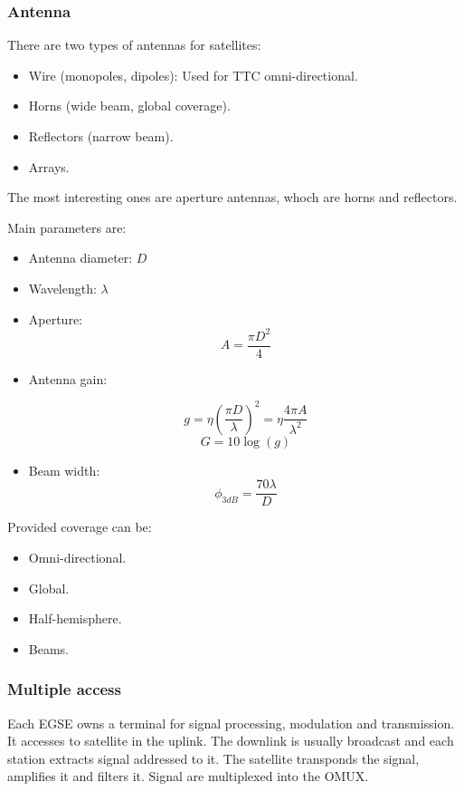 \documentclass[../main.tex]{subfiles}
\begin{document}
\subsubsection{Antenna}

There are two types of antennas for satellites:
\begin{itemize}
	\item Wire (monopoles, dipoles): Used for TTC omni-directional.
	\item Horns (wide beam, global coverage).
	\item Reflectors (narrow beam).
	\item Arrays.
\end{itemize}

The most interesting ones are aperture antennas, whoch are horns and reflectors.

Main parameters are:

\begin{itemize}
	\item Antenna diameter: $D$
	\item Wavelength: $\lambda$
	\item {
		Aperture:
		$$
			A = \frac {\pi D^2} {4}
		$$
	}
	\item {
		Antenna gain:

		$$
			g = \eta \left( \frac {\pi D} {\lambda} \right)^2 = \eta \frac {4 \pi A} {\lambda^2}
		$$
		$$
			G = 10 \log (g)
		$$
	}
	\item {
		Beam width:
		$$
			\phi_{3dB} = \frac {70 \lambda} {D}
		$$
	}
\end{itemize}

Provided coverage can be:
\begin{itemize}
	\item Omni-directional.
	\item Global.
	\item Half-hemisphere.
	\item Beams.
\end{itemize}

\subsubsection{Multiple access}

Each EGSE owns a terminal for signal processing, modulation and transmission. It accesses to satellite in the uplink. The downlink is usually broadcast and each station extracts signal addressed to it. The satellite transponds the signal, amplifies it and filters it. Signal are multiplexed into the OMUX.
\end{document}
